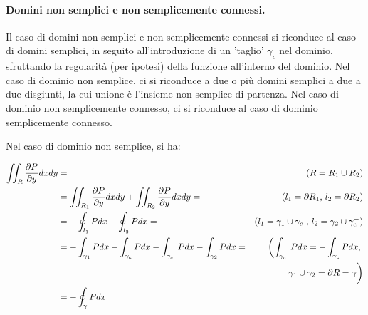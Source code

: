 \paragraph{Domini non semplici e non semplicemente connessi.}
Il caso di domini non semplici e non semplicemente connessi si riconduce al caso di domini semplici, in seguito all'introduzione
di un 'taglio' $\gamma_c$ nel dominio, sfruttando la regolarità (per ipotesi) della funzione all'interno del dominio.
 Nel caso di dominio non semplice, ci si riconduce a due o più domini semplici a due a due disgiunti, la cui unione è l'insieme 
non semplice di partenza. Nel caso di dominio non semplicemente connesso, ci si riconduce al caso di dominio semplicemente 
connesso.

Nel caso di dominio non semplice, si ha:

\begin{equation}
\begin{aligned}
  \iint_R \frac{\partial P}{\partial y} dx dy & = & \text{($R = R_1 \cup R_2$)} \\
  & = \iint_{R_1} \frac{\partial P}{\partial y} dx dy + \iint_{R_2} \frac{\partial P}{\partial y} dx dy = & \text{($l_1 = \partial R_1$, $l_2 = \partial R_2$)} \\
  & = - \oint_{l_1} P dx - \oint_{l_2} P dx = & \text{($l_1 = \gamma_1 \cup \gamma_c$ , $l_2 = \gamma_2 \cup \gamma_c^{-}$)} \\
  & = - \int_{\gamma_1} P dx - \int_{\gamma_c} P dx - \int_{\gamma_c^{-}} P dx - \int_{\gamma_2} P dx = & 
  \text{$\displaystyle\left(\int_{\gamma_c^{-}} P dx = -\int_{\gamma_c} P dx ,  \right.$} \\
  & & \text{$ \gamma_1 \cup \gamma_2 = \partial R = \gamma \bigg)$}
 \\
  & = -\oint_\gamma P dx
\end{aligned}
\end{equation}

